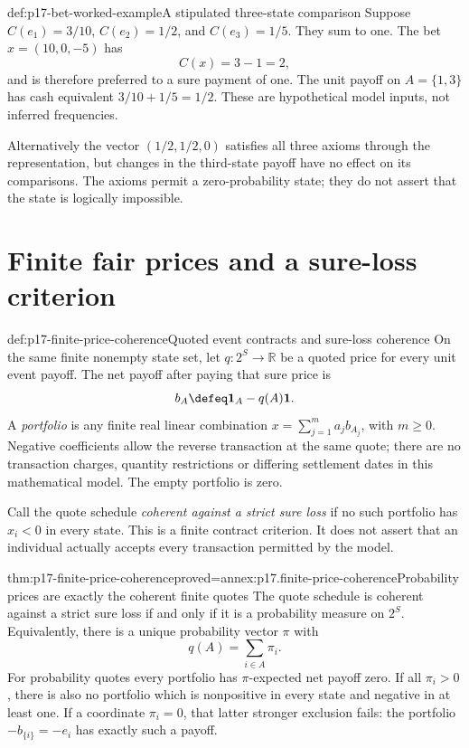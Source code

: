 \begin{hbexample}{def:p17-bet-worked-example}{A stipulated three-state comparison}
Suppose \(C(e_1)=3/10\), \(C(e_2)=1/2\), and \(C(e_3)=1/5\).
They sum to one. The bet \(x=(10,0,-5)\) has
\[
                         C(x)=3-1=2,
\]
and is therefore preferred to a sure payment of one. The unit payoff
on \(A=\{1,3\}\) has cash equivalent \(3/10+1/5=1/2\).
These are hypothetical model inputs, not inferred frequencies.

Alternatively the vector \((1/2,1/2,0)\) satisfies all three axioms
through the representation, but changes in the third-state payoff have
no effect on its comparisons. The axioms permit a zero-probability
state; they do not assert that the state is logically impossible.
\end{hbexample}

\section{Finite fair prices and a sure-loss criterion}
\label{sec:p17-finite-price-coherence}

\begin{hbdefinition}{def:p17-finite-price-coherence}{Quoted event contracts and sure-loss coherence}
On the same finite nonempty state set, let \(q:2^S\to\mathbb R\)
be a quoted price for every unit event payoff. The net payoff after
paying that sure price is
\[
                       b_A\defeq\mathbf1_A-q(A)\mathbf1.
\]
A \emph{portfolio} is any finite real linear combination
\(x=\sum_{j=1}^m a_jb_{A_j}\), with \(m\geq0\).
Negative coefficients allow the reverse transaction at the same quote;
there are no transaction charges, quantity restrictions or differing
settlement dates in this mathematical model. The empty portfolio is zero.

Call the quote schedule \emph{coherent against a strict sure loss} if
no such portfolio has \(x_i<0\) in every state.
This is a finite contract criterion. It does not assert that an
individual actually accepts every transaction permitted by the model.
\end{hbdefinition}

\begin{hbtheorem}{thm:p17-finite-price-coherence}{proved=annex:p17.finite-price-coherence}{Probability prices are exactly the coherent finite quotes}
The quote schedule is coherent against a strict sure loss if and only
if it is a probability measure on \(2^S\). Equivalently, there is
a unique probability vector \(\pi\) with
\[
                            q(A)=\sum_{i\in A}\pi_i.
\]
For probability quotes every portfolio has \(\pi\)-expected net
payoff zero. If all \(\pi_i>0\), there is also no portfolio which
is nonpositive in every state and negative in at least one. If a
coordinate \(\pi_i=0\), that latter stronger exclusion fails:
the portfolio \(-b_{\{i\}}=-e_i\) has exactly such a payoff.
\end{hbtheorem}

